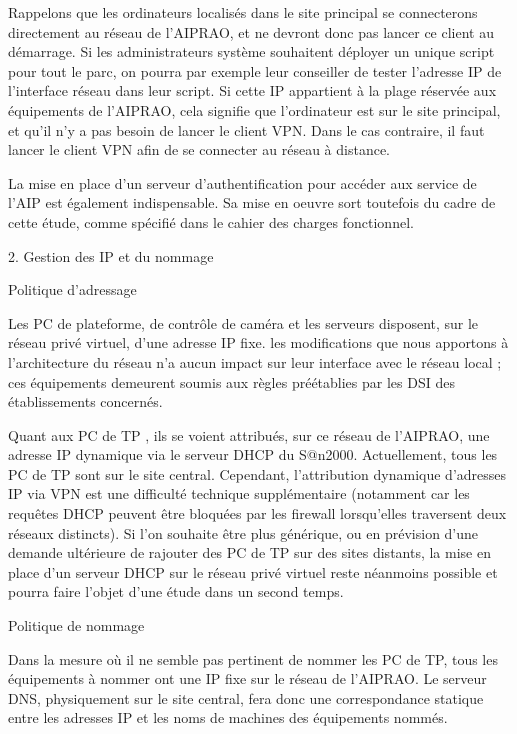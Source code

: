 	Rappelons que les ordinateurs localisés dans le site principal se connecterons directement au  réseau de l'AIPRAO, et ne devront donc pas lancer ce client au démarrage. Si les administrateurs système souhaitent déployer un unique script pour tout le parc, on pourra par exemple leur conseiller de tester l'adresse IP de l'interface réseau dans leur script. Si cette IP appartient à la plage réservée aux équipements de l'AIPRAO, cela signifie que l'ordinateur est sur le site principal, et qu'il n'y a pas besoin de lancer le client VPN. Dans le cas contraire, il faut lancer le  client VPN afin de se connecter au réseau à distance.

	La mise en place d'un serveur d'authentification pour accéder aux service de l'AIP est également indispensable. Sa mise en oeuvre sort toutefois du cadre de cette étude,  comme spécifié dans le cahier des charges fonctionnel.
 
2. Gestion des IP et du nommage

Politique d'adressage

	Les PC de plateforme, de contrôle de caméra et les serveurs disposent, sur le réseau privé virtuel, d'une adresse IP fixe. les modifications que nous apportons à l'architecture du réseau n'a aucun impact sur leur interface avec le réseau local ; ces équipements demeurent soumis aux règles préétablies par les DSI des établissements concernés.

	Quant aux PC de TP , ils se voient attribués, sur ce réseau de l'AIPRAO, une adresse IP dynamique via le serveur DHCP du S@n2000. 
	Actuellement, tous les PC de TP sont sur le site central. Cependant, l'attribution dynamique d'adresses IP via VPN est une difficulté technique supplémentaire (notamment car les requêtes DHCP peuvent être bloquées par les firewall lorsqu'elles traversent deux réseaux distincts). 
	Si l'on souhaite être plus générique, ou en prévision d'une demande ultérieure de rajouter des PC de TP sur des sites distants, la mise en place d'un serveur DHCP sur le réseau privé virtuel reste néanmoins possible et pourra faire l'objet d'une étude dans un second temps.


Politique de nommage

	Dans la mesure où il ne semble pas pertinent de nommer les PC de TP, tous les équipements à nommer ont une IP fixe sur le réseau de l'AIPRAO. Le serveur DNS, physiquement sur le site central, fera donc une correspondance statique entre les adresses IP et les noms de machines des équipements nommés. 
	
